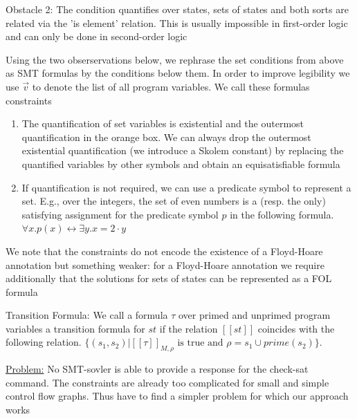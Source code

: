 \documentclass[landscape, a4paper]{article}
\begin{document}
\begin{minipage}[t]{0.2\linewidth}
\begin{betterlist}
\begin{betterlist}
		\end{betterlist}
		\item \alert{Obstacle 2:} The condition quantifies over states, sets of states and both sorts are related via the 'is element' relation. This is usually impossible in first-order logic and can only be done in second-order logic
		\begin{betterlist}
			\item Using the two obserservations below, we rephrase the set conditions from above as SMT formulas by the conditions below them. In order to improve legibility we use $\vec{v}$ to denote the list of all program variables. We call these formulas constraints
			\begin{enumerate}
				\item The quantification of set variables is existential and the outermost quantification in the orange box. We can always drop the outermost existential quantification (we introduce a Skolem constant) by replacing the quantified variables by other symbols and obtain an equisatisfiable formula
				\item If quantification is not required, we can use a predicate symbol to represent a set. E.g., over the integers, the set of even numbers is a (resp. the only) satisfying assignment for the predicate symbol $p$ in the following formula. $\forall x.p(x) \leftrightarrow \exists y.x = 2 \cdot y$
			\end{enumerate}
			\item We note that the constraints do not encode the existence of a Floyd-Hoare annotation but something weaker: for a Floyd-Hoare annotation we require additionally that the solutions for sets of states can be represented as a FOL formula
		\end{betterlist}
		\item \color{orange}\alert{Transition Formula:}  We call a formula $\tau$ over primed and unprimed program variables a \alert{transition formula} for $st$ if the relation $[[st]]$ coincides with the following relation. $\{(s_1, s_2) | [[\tau]]_{M,\rho} \text{ is true and } \rho = s_1 \cup prime(s_2)\}$. \color{black}
		\item \underline{Problem:} No SMT-sovler is able to provide a response for the check-sat command. The constraints are already too complicated for small and simple control flow graphs. Thus have to find a simpler problem for which our approach works
		\begin{betterlist}

\end{betterlist}
\end{betterlist}
\end{minipage}
\end{document}
